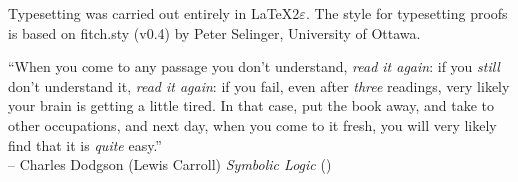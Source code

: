 \vfill

Typesetting was carried out entirely in \LaTeX$2\varepsilon$. The style for typesetting proofs is based on fitch.sty (v0.4) by Peter Selinger, University of Ottawa.






\pagebreak

``When you come to any passage you don't understand, \emph{read it again}: if you \emph{still} don't understand it, \emph{read it again}: if you fail, even after \emph{three} readings, very likely your brain is getting a little tired. In that case, put the book away, and take to other occupations, and next day, when you come to it fresh, you will very likely find that it is \emph{quite} easy.'' \\
-- Charles Dodgson (Lewis Carroll) \emph{Symbolic Logic} (\citeyear{Dodgson1896})


\vspace{5cm}
%
